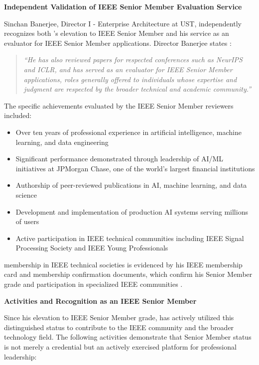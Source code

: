 \textbf{Independent Validation of IEEE Senior Member Evaluation Service}

Sinchan Banerjee, Director I - Enterprise Architecture at UST, independently recognizes both \dr's elevation to IEEE Senior Member and his service as an evaluator for IEEE Senior Member applications. Director Banerjee states \cite{LOR4}:

\begin{quote}
\textit{``He has also reviewed papers for respected conferences such as NeurIPS and ICLR, and has served as an evaluator for IEEE Senior Member applications, roles generally offered to individuals whose expertise and judgment are respected by the broader technical and academic community.''}
\end{quote}

The specific achievements evaluated by the IEEE Senior Member reviewers included:
\begin{itemize}
    \item Over ten years of professional experience in artificial intelligence, machine learning, and data engineering
    \item Significant performance demonstrated through leadership of AI/ML initiatives at JPMorgan Chase, one of the world's largest financial institutions
    \item Authorship of peer-reviewed publications in AI, machine learning, and data science
    \item Development and implementation of production AI systems serving millions of users
    \item Active participation in IEEE technical communities including IEEE Signal Processing Society and IEEE Young Professionals
\end{itemize}

\drs membership in IEEE technical societies is evidenced by his IEEE membership card and membership confirmation documents, which confirm his Senior Member grade and participation in specialized IEEE communities \cite{ieeemembercard, ieeeypmember}.

\textbf{Activities and Recognition as an IEEE Senior Member}

Since his elevation to IEEE Senior Member grade, \dr has actively utilized this distinguished status to contribute to the IEEE community and the broader technology field. The following activities demonstrate that \drs Senior Member status is not merely a credential but an actively exercised platform for professional leadership:

